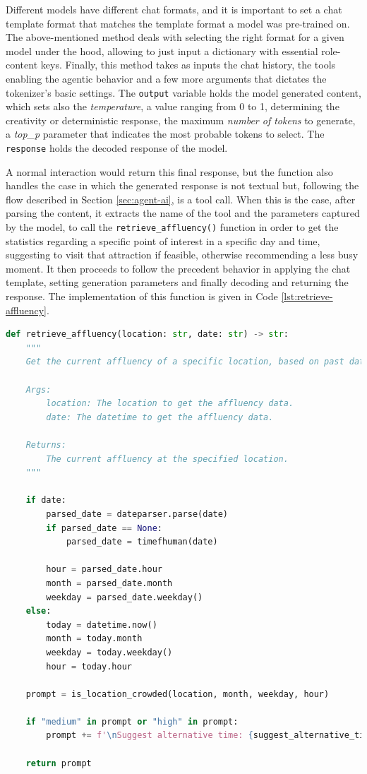 Different models have different chat formats, and it is important to set a chat template format that matches the template format a model was pre-trained on. The above-mentioned method deals with selecting the right format for a given model under the hood, allowing to just input a dictionary with essential role-content keys.
Finally, this method takes as inputs the chat history, the tools enabling the agentic behavior and a few more arguments that dictates the tokenizer's basic settings.
The \texttt{output} variable holds the model generated content, which sets also the \textit{temperature}, a value ranging from 0 to 1, determining the creativity or deterministic response, the maximum \textit{number of tokens} to generate, a \textit{top\_p} parameter that indicates the most probable tokens to select. The \texttt{response} holds the decoded response of the model.

A normal interaction would return this final response, but the function also handles the case in which the generated response is not textual but, following the flow described in Section \ref{sec:agent-ai}, is a tool call. When this is the case, after parsing the content, it extracts the name of the tool and the parameters captured by the model, to call the \texttt{retrieve\_affluency()} function in order to get the statistics regarding a specific point of interest in a specific day and time, suggesting to visit that attraction if feasible, otherwise recommending a less busy moment. It then proceeds to follow the precedent behavior in applying the chat template, setting generation parameters and finally decoding and returning the response. The implementation of this function is given in Code \ref{lst:retrieve-affluency}.

\begin{center}
\begin{lstlisting}[language=Python, frame=single, caption=\texttt{retrieve\_affluency()} Function., label=lst:retrieve-affluency]
def retrieve_affluency(location: str, date: str) -> str:
    """
    Get the current affluency of a specific location, based on past data.

    Args:
        location: The location to get the affluency data.
        date: The datetime to get the affluency data.

    Returns:
        The current affluency at the specified location.
    """

    if date:
        parsed_date = dateparser.parse(date)
        if parsed_date == None:
            parsed_date = timefhuman(date)

        hour = parsed_date.hour
        month = parsed_date.month
        weekday = parsed_date.weekday()
    else:
        today = datetime.now()
        month = today.month
        weekday = today.weekday()
        hour = today.hour

    prompt = is_location_crowded(location, month, weekday, hour)

    if "medium" in prompt or "high" in prompt:
        prompt += f'\nSuggest alternative time: {suggest_alternative_time(location, month, weekday)}.'

    return prompt
\end{lstlisting}
\end{center}

